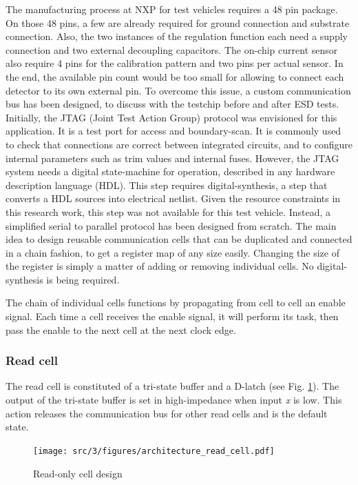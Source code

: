 The manufacturing process at NXP for test vehicles requires a 48 pin package.
On those 48 pins, a few are already required for ground connection and substrate connection.
Also, the two instances of the regulation function each need a supply connection and two external decoupling capacitors.
The on-chip current sensor also require 4 pins for the calibration pattern and two pins per actual sensor.
In the end, the available pin count would be too small for allowing to connect each detector to its own external pin.
To overcome this issue, a custom communication bus has been designed, to discuss with the testchip before and after ESD tests.
Initially, the JTAG (Joint Test Action Group) \cite{jtag} protocol was envisioned for this application.
It is a test port for access and boundary-scan.
It is commonly used to check that connections are correct between integrated circuits, and to configure internal parameters such as trim values and internal fuses.
However, the JTAG system needs a digital state-machine for operation, described in any hardware description language (HDL).
This step requires digital-synthesis, a step that converts a HDL sources into electrical netlist.
Given the resource constraints in this research work, this step was not available for this test vehicle.
Instead, a simplified serial to parallel protocol has been designed from scratch.
The main idea to design reusable communication cells that can be duplicated and connected in a chain fashion, to get a register map of any size easily.
Changing the size of the register is simply a matter of adding or removing individual cells.
No digital-synthesis is being required.

The chain of individual cells functions by propagating from cell to cell an enable signal.
Each time a cell receives the enable signal, it will perform its task, then pass the enable to the next cell at the next clock edge.

\subsubsection{Read cell}

The read cell is constituted of a tri-state buffer and a D-latch (see Fig. \ref{fig:read-cell-design}).
The output of the tri-state buffer is set in high-impedance when input \textit{x} is low.
This action releases the communication bus for other read cells and is the default state.

\begin{figure}[!h]
  \centering
  \texttt{[image: src/3/figures/architecture\_read\_cell.pdf]}
  \caption{Read-only cell design}
  \label{fig:read-cell-design}
\end{figure}

